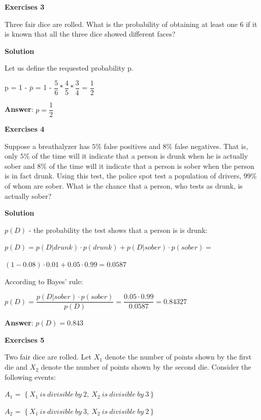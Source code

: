 \documentclass[12pt]{article}
\theoremstyle{definiton}
\theoremstyle{definition}
\theoremstyle{definition}
\begin{document}
		\textbf{Exercises 3}
		
		Three fair dice are rolled. What is the probability of obtaining at least one 6 if it is known that all the three dice showed different faces?

		\medskip
		
		\textbf{Solution}
		
Let us define the requested probability p.

p = 1 - $\overline{p}$ = 1 - $\dfrac{5}{6}*\dfrac{4}{5}*\dfrac{3}{4}$ = $\dfrac{1}{2}$
		
		\medskip
		\textbf{Answer}: $p = \dfrac{1}{2}$
		
		\bigskip
		
		\textbf{Exercises 4}
		
Suppose a breathalyzer has $5\%$  false positives and $8\%$ false negatives. That is, only $5\%$ of the time will it indicate that a person is drunk when he is actually sober and $8\%$ of the time will it indicate that a person is sober when the person is in fact drunk. Using this test, the police spot test a population of drivers, $99\%$ of whom are sober.
What is the chance that a person, who tests as drunk, is actually sober?

		\medskip
		
		\textbf{Solution}

		$p\left(D\right)$ - the probability the test shows that a person is is drunk:
		
		$p\left(D\right) = p\left(D|drunk\right)\cdotp p \left(drunk\right)+p\left(D|sober\right)\cdot p\left(sober\right) =$
		
$\left(1-0.08\right)\cdot 0.01+0.05\cdot 0.99 = 0.0587$
		
		According to Bayes' rule:
		
		$p\left(D\right)=\dfrac{p(D|sober)\cdot p\left(sober\right)}{p\left(D\right)}=\dfrac{0.05\cdot 0.99}{0.0587}=0.84327$
		
		\medskip
		\textbf{Answer}: $p\left(D\right) = 0.843$
		
		\bigskip
		
		\textbf{Exercises 5}
		
		Two fair dice are rolled. Let $X_1$ denote the number of points shown by the first die and $X_2$ denote the number of points shown by the second die. Consider the following events:
		
$A_1$ = $\left\lbrace X_1\ is\ divisible\ by\ 2,\ X_2\ is\ divisible\ by\ 3 \right\rbrace$

$A_2$ = $\left\lbrace X_1\ is\ divisible\ by\ 3,\ X_2\ is\ divisible\ by\ 2 \right\rbrace$
\end{document}
